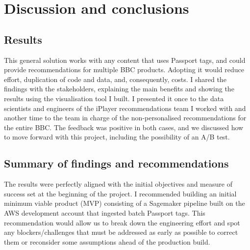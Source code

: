 \section{Discussion and conclusions}

\subsection{Results}

This general solution works with any content that uses Passport tags,
and could provide recommendations for multiple BBC products.
Adopting it would reduce effort, duplication of code and data, and, consequently, costs.
I shared the findings with the stakeholders,
explaining the main benefits and showing the results using the visualisation tool I built.
I presented it once to the data scientists and engineers of the iPlayer recommendations team
I worked with and another time to the team in charge of the non-personalised recommendations for the entire BBC.
The feedback was positive in both cases, and we discussed how to move forward with this project,
including the possibility of an A/B test.

\subsection{Summary of findings and recommendations}

The results were perfectly aligned with the initial objectives and measure of success set at the beginning of the project.
I recommended building an initial minimum viable product (MVP) consisting of a Sagemaker pipeline
built on the AWS development account that ingested batch Passport tags.
This recommendation would allow us to break down the engineering effort and spot any blockers/challenges that must be addressed
as early as possible to correct them or reconsider some assumptions ahead of the production build.

